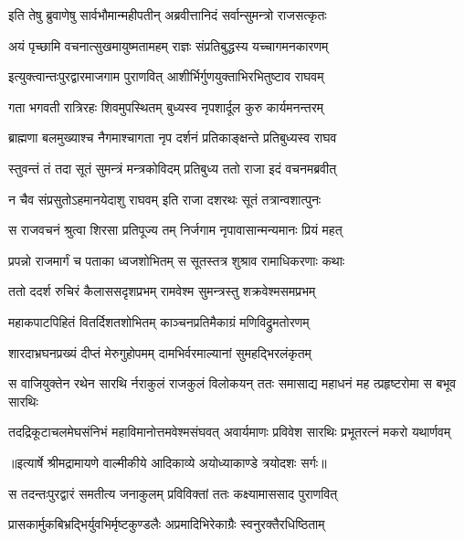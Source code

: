 \twolineshloka
{इति तेषु ब्रुवाणेषु सार्वभौमान्महीपतीन्}
{अब्रवीत्तानिदं सर्वान्सुमन्त्रो राजसत्कृतः} %

\twolineshloka
{अयं पृच्छामि वचनात्सुखमायुष्मतामहम्}
{राज्ञः संप्रतिबुद्धस्य यच्चागमनकारणम्} %

\twolineshloka
{इत्युक्त्वान्तःपुरद्वारमाजगाम पुराणवित्}
{आशीर्भिर्गुणयुक्ताभिरभितुष्टाव राघवम्} %

\twolineshloka
{गता भगवती रात्रिरहः शिवमुपस्थितम्}
{बुध्यस्व नृपशार्दूल कुरु कार्यमनन्तरम्} %

\twolineshloka
{ब्राह्मणा बलमुख्याश्च नैगमाश्चागता नृप}
{दर्शनं प्रतिकाङ्क्षन्ते प्रतिबुध्यस्व राघव} %

\twolineshloka
{स्तुवन्तं तं तदा सूतं सुमन्त्रं मन्त्रकोविदम्}
{प्रतिबुध्य ततो राजा इदं वचनमब्रवीत्} %

\twolineshloka
{न चैव संप्रसुतोऽहमानयेदाशु राघवम्}
{इति राजा दशरथः सूतं तत्रान्वशात्पुनः} %

\twolineshloka
{स राजवचनं श्रुत्वा शिरसा प्रतिपूज्य तम्}
{निर्जगाम नृपावासान्मन्यमानः प्रियं महत्} %

\twolineshloka
{प्रपन्नो राजमार्गं च पताका ध्वजशोभितम्}
{स सूतस्तत्र शुश्राव रामाधिकरणाः कथाः} %

\twolineshloka
{ततो ददर्श रुचिरं कैलाससदृशप्रभम्}
{रामवेश्म सुमन्त्रस्तु शक्रवेश्मसमप्रभम्} %

\twolineshloka
{महाकपाटपिहितं वितर्दिशतशोभितम्}
{काञ्चनप्रतिमैकाग्रं मणिविद्रुमतोरणम्} %

\twolineshloka
{शारदाभ्रघनप्रख्यं दीप्तं मेरुगुहोपमम्}
{दामभिर्वरमाल्यानां सुमहद्भिरलंकृतम्} %

\fourlineindentedshloka
{स वाजियुक्तेन रथेन सारथि}
{र्नराकुलं राजकुलं विलोकयन्}
{ततः समासाद्य महाधनं मह}
{त्प्रहृष्टरोमा स बभूव सारथिः} %

\fourlineindentedshloka
{तदद्रिकूटाचलमेघसंनिभं}
{ महाविमानोत्तमवेश्मसंघवत्}
{अवार्यमाणः प्रविवेश सारथिः}
{ प्रभूतरत्नं मकरो यथार्णवम्} %


{॥इत्यार्षे श्रीमद्रामायणे वाल्मीकीये आदिकाव्ये अयोध्याकाण्डे त्रयोदशः सर्गः॥}


\twolineshloka
{स तदन्तःपुरद्वारं समतीत्य जनाकुलम्}
{प्रविविक्तां ततः कक्ष्यामाससाद पुराणवित्} %

\twolineshloka
{प्रासकार्मुकबिभ्रद्भिर्युवभिर्मृष्टकुण्डलैः}
{अप्रमादिभिरेकाग्रैः स्वनुरक्तैरधिष्ठिताम्} %

